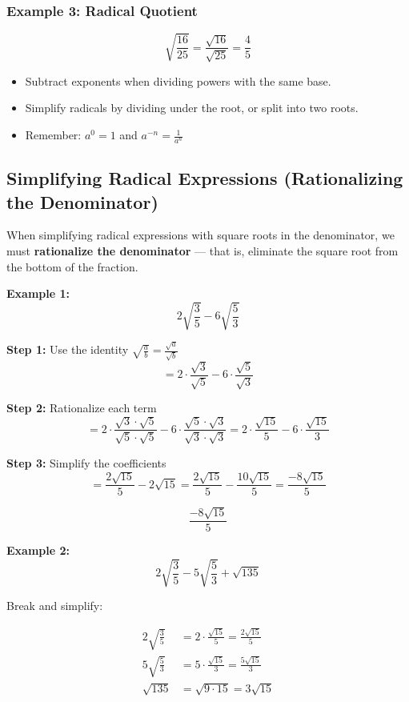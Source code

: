 \documentclass[11pt]{article}
\begin{document}
\subsubsection*{Example 3: Radical Quotient}
\[
\sqrt{\frac{16}{25}} = \frac{\sqrt{16}}{\sqrt{25}} = \frac{4}{5}
\]

\begin{tcolorbox}[colback=gray!5!white, colframe=gray!80!black, title=Summary]
\begin{itemize}
  \item Subtract exponents when dividing powers with the same base.
  \item Simplify radicals by dividing under the root, or split into two roots.
  \item Remember: \( a^0 = 1 \) and \( a^{-n} = \frac{1}{a^n} \)
\end{itemize}
\end{tcolorbox}

\subsection{Simplifying Radical Expressions (Rationalizing the Denominator)}

When simplifying radical expressions with square roots in the denominator, we must \textbf{rationalize the denominator} — that is, eliminate the square root from the bottom of the fraction.

\medskip
\textbf{Example 1:}
\[
2\sqrt{\frac{3}{5}} - 6\sqrt{\frac{5}{3}}
\]

\textbf{Step 1:} Use the identity \(\sqrt{\frac{a}{b}} = \frac{\sqrt{a}}{\sqrt{b}}\)
\[
= 2 \cdot \frac{\sqrt{3}}{\sqrt{5}} - 6 \cdot \frac{\sqrt{5}}{\sqrt{3}}
\]

\textbf{Step 2:} Rationalize each term
\[
= 2 \cdot \frac{\sqrt{3} \cdot \sqrt{5}}{\sqrt{5} \cdot \sqrt{5}} - 6 \cdot \frac{\sqrt{5} \cdot \sqrt{3}}{\sqrt{3} \cdot \sqrt{3}}
= 2 \cdot \frac{\sqrt{15}}{5} - 6 \cdot \frac{\sqrt{15}}{3}
\]

\textbf{Step 3:} Simplify the coefficients
\[
= \frac{2\sqrt{15}}{5} - 2\sqrt{15}
= \frac{2\sqrt{15}}{5} - \frac{10\sqrt{15}}{5}
= \frac{-8\sqrt{15}}{5}
\]

\[
\boxed{\frac{-8\sqrt{15}}{5}}
\]

\bigskip
\textbf{Example 2:}
\[
2\sqrt{\frac{3}{5}} - 5\sqrt{\frac{5}{3}} + \sqrt{135}
\]

Break and simplify:

\begin{align*}
2\sqrt{\frac{3}{5}} &= 2 \cdot \frac{\sqrt{15}}{5} = \frac{2\sqrt{15}}{5} \\
5\sqrt{\frac{5}{3}} &= 5 \cdot \frac{\sqrt{15}}{3} = \frac{5\sqrt{15}}{3} \\
\sqrt{135} &= \sqrt{9 \cdot 15} = 3\sqrt{15}
\end{align*}
\end{document}

